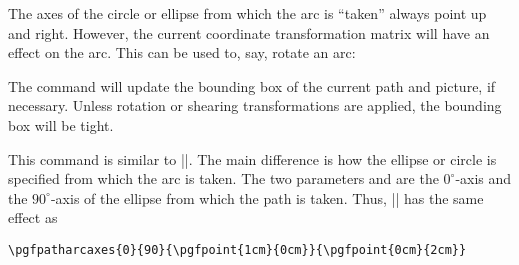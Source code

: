 \begin{command}{\pgfpatharc{}}
  The axes of the circle or ellipse from which the arc is ``taken''
  always point up and right. However, the current coordinate
  transformation matrix will have an effect on the arc. This can be
  used to, say, rotate an arc:

\begin{codeexample}[]
\end{codeexample}

  The command will update the bounding box of the current path and
  picture, if necessary. Unless rotation or shearing transformations
  are applied, the bounding box will be tight.
\end{command}

\begin{command}{\pgfpatharcaxes{}}
  This command is similar to |\pgfpatharc|. The main difference is how
  the ellipse or circle is specified from which the arc is taken. The
  two parameters  and  are the
  $0^\circ$-axis and the $90^\circ$-axis of the ellipse from which the
  path is taken. Thus, || has the same effect
  as
\begin{verbatim}
\pgfpatharcaxes{0}{90}{\pgfpoint{1cm}{0cm}}{\pgfpoint{0cm}{2cm}}
\end{verbatim}
\begin{codeexample}[]
\end{codeexample}
\end{command}


